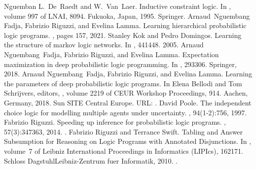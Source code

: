 \documentclass[letterpaper,10pt,english]{sphinxmanual}
\begin{document}
\begin{sphinxthebibliography}{Nguemban}
L. De Raedt and W. Van Laer. Inductive constraint logic. In , volume 997 of LNAI, 80\textendash{}94. Fukuoka, Japan, 1995. Springer.
Arnaud Nguembang Fadja, Fabrizio Riguzzi, and Evelina Lamma. Learning hierarchical probabilistic logic programs. , pages 1\textendash{}57, 2021.
Stanley Kok and Pedro Domingos. Learning the structure of markov logic networks. In , 441\textendash{}448. 2005.
Arnaud Nguembang Fadja, Fabrizio Riguzzi, and Evelina Lamma. Expectation maximization in deep probabilistic logic programming. In , 293\textendash{}306. Springer, 2018.
Arnaud Nguembang Fadja, Fabrizio Riguzzi, and Evelina Lamma. Learning the parameters of deep probabilistic logic programs. In Elena Bellodi and Tom Schrijvers, editors, , volume 2219 of CEUR Workshop Proceedings, 9\textendash{}14. Aachen, Germany, 2018. Sun SITE Central Europe. URL: .
David Poole. The independent choice logic for modelling multiple agents under uncertainty. , 94(1-2):7\textendash{}56, 1997.
Fabrizio Riguzzi. Speeding up inference for probabilistic logic programs. , 57(3):347\textendash{}363, 2014. .
Fabrizio Riguzzi and Terrance Swift. Tabling and Answer Subsumption for Reasoning on Logic Programs with Annotated Disjunctions. In , volume 7 of Leibniz International Proceedings in Informatics (LIPIcs), 162\textendash{}171. Schloss Dagstuhl\textendash{}Leibniz-Zentrum fuer Informatik, 2010. .

\end{sphinxthebibliography}
\end{document}
